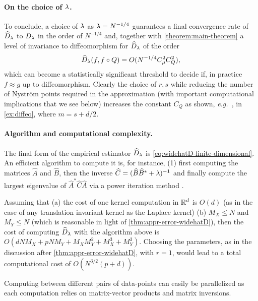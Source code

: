 \paragraph{On the choice of $\lambda$.}
To conclude, a choice of $\lambda$ as $\lambda = N^{-1/4}$ guarantees a final convergence rate of $\widehat{D}_\lambda$ to $D_\lambda$ in the order of $N^{-1/4}$ and, together with \cref{theorem:main-theorem} a level of invariance to diffeomorphism for $\widehat{D}_\lambda$ of the order
$$\widehat{D}_\lambda(f, f \circ Q) = O(N^{-1/4} C_\mu^2 C_Q^2),$$
which can become a statistically significant threshold to decide if, in practice $f \approx g$ up to diffeomorphism.
Clearly the choice of $r,s$ while reducing the number of Nystr\"om points required in the approximation (with important computational implications that we see below) increases the constant $C_Q$ as shown, \emph{e.g.\ }, in \cref{ex:diffeo}, where $m = s + d/2$.



\paragraph{Algorithm and computational complexity.}
The final form of the empirical estimator $\widehat{D}_\lambda$ is \cref{eq:widehatD-finite-dimensional}. An efficient algorithm to compute it is, for instance, (1) first computing the matrices $\widehat{A}$ and $\widehat{B}$, then the inverse $\widehat{C} = (\widehat{B}\widehat{B}^* + \lambda)^{-1}$ and finally compute the largest eigenvalue of $\widehat{A}^* \widehat{C} \widehat{A}$ via a power iteration method \cite{trefethen1997numerical}. %

Assuming that (a) the cost of one kernel computation in $\mathbb R^d$ is $O(d)$ (as in the case of any translation invariant kernel as the Laplace kernel) (b) $M_X \leq N$ and $M_Y \leq N$ (which is reasonable in light of \cref{thm:appr-error-widehatD}), then the cost of computing $\widehat{D}_\lambda$ with the algorithm above is
$O(d N M_X + p N M_Y + M_XM_Y^2 + M_X^3 + M_Y^3)$.
Choosing the parameters, as in the discussion after \cref{thm:appr-error-widehatD}, with $r = 1$, would lead to a total computational cost of
$O(N^{3/2}(p+d)).$

Computing \Diffy between different pairs of data-points can easily be parallelized as each computation relies on matrix-vector products and matrix inversions.

